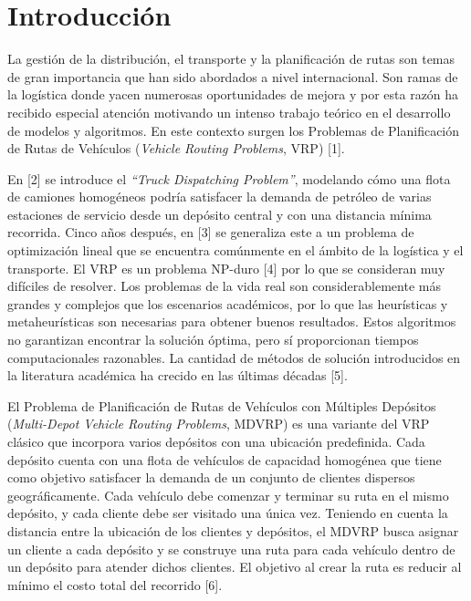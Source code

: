 \chapter*{Introducci\'on}

La gesti\'on de la distribuci\'on, el transporte y la planificaci\'on de rutas son temas de gran importancia que han sido abordados a nivel internacional. Son ramas de la log\'istica donde yacen numerosas oportunidades de mejora y por esta raz\'on ha recibido especial atenci\'on motivando un intenso trabajo te\'orico en el desarrollo de modelos y algoritmos. En este contexto surgen los Problemas de Planificaci\'on de Rutas de Veh\'iculos (\textit{Vehicle Routing Problems}, VRP) [1].

En [2] se introduce el \textit{``Truck Dispatching Problem''}, modelando c\'omo una flota de camiones homog\'eneos podr\'ia satisfacer la demanda de petr\'oleo de varias estaciones de servicio desde un dep\'osito central y con una distancia m\'inima recorrida. Cinco a\~nos despu\'es, en [3] se generaliza este a un problema de optimizaci\'on lineal que se encuentra com\'unmente en el \'ambito de la log\'istica y el transporte. El VRP es un problema NP-duro [4] por lo que se consideran muy dif\'iciles de resolver. Los problemas de la vida real son considerablemente m\'as grandes y complejos que los escenarios acad\'emicos, por lo que las heur\'isticas y metaheur\'isticas son necesarias para obtener buenos resultados. Estos algoritmos no garantizan encontrar la soluci\'on \'optima, pero s\'i proporcionan tiempos computacionales razonables. La cantidad de m\'etodos de soluci\'on introducidos en la literatura acad\'emica ha crecido en las \'ultimas d\'ecadas [5].

El Problema de Planificaci\'on de Rutas de Veh\'iculos con M\'ultiples Dep\'ositos (\textit{Multi-Depot Vehicle Routing Problems}, MDVRP) es una variante del VRP cl\'asico que incorpora varios dep\'ositos con una ubicaci\'on predefinida. Cada dep\'osito cuenta con una flota de veh\'iculos de capacidad homog\'enea que tiene como objetivo satisfacer la demanda de un conjunto de clientes dispersos geogr\'aficamente. Cada veh\'iculo debe comenzar y terminar su ruta en el mismo dep\'osito, y cada cliente debe ser visitado una \'unica vez. Teniendo en cuenta la distancia entre la ubicaci\'on de los clientes y dep\'ositos, el MDVRP busca asignar un cliente a cada dep\'osito y se construye una ruta para cada veh\'iculo dentro de un dep\'osito para atender dichos clientes. El objetivo al crear la ruta es reducir al m\'inimo el costo total del recorrido [6].

